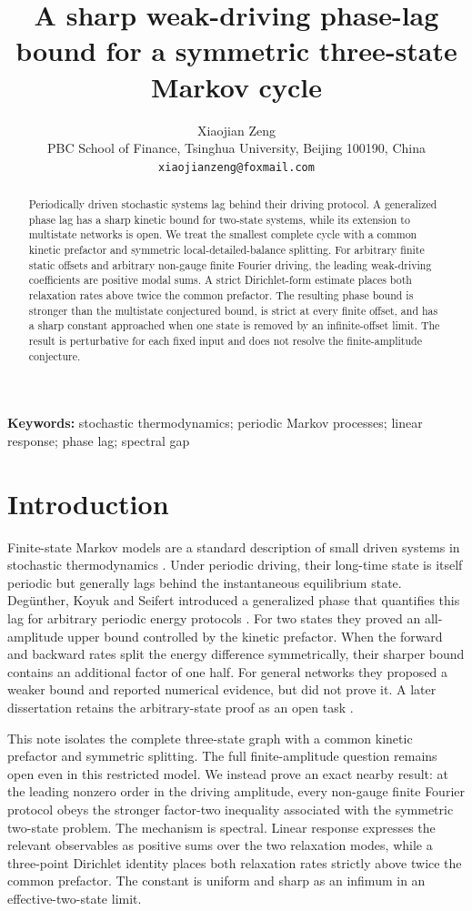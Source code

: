 \documentclass[11pt,a4paper]{article}
\title{A sharp weak-driving phase-lag bound for a symmetric three-state Markov cycle}
\author{Xiaojian Zeng\\
\small PBC School of Finance, Tsinghua University, Beijing 100190, China\\
\small \texttt{xiaojianzeng@foxmail.com}}
\date{}
\begin{document}
\maketitle

\begin{abstract}
Periodically driven stochastic systems lag behind their driving protocol. A generalized
phase lag has a sharp kinetic bound for two-state systems, while its extension to
multistate networks is open. We treat the smallest complete cycle with a common kinetic
prefactor and symmetric local-detailed-balance splitting. For arbitrary finite static
offsets and arbitrary non-gauge finite Fourier driving, the leading weak-driving
coefficients are positive modal sums. A strict Dirichlet-form estimate places both
relaxation rates above twice the common prefactor. The resulting phase bound is stronger
than the multistate conjectured bound, is strict at every finite offset, and has a sharp
constant approached when one state is removed by an infinite-offset limit. The result is
perturbative for each fixed input and does not resolve the finite-amplitude conjecture.
\end{abstract}

\noindent\textbf{Keywords:} stochastic thermodynamics; periodic Markov processes;
linear response; phase lag; spectral gap

\section{Introduction}

Finite-state Markov models are a standard description of small driven systems in
stochastic thermodynamics \cite{Seifert2012}. Under periodic driving, their long-time
state is itself periodic but generally lags behind the instantaneous equilibrium state.
Deg\"unther, Koyuk and Seifert introduced a generalized phase that quantifies this lag
for arbitrary periodic energy protocols \cite{Deguenther2022}. For two states they proved
an all-amplitude upper bound controlled by the kinetic prefactor. When the forward and
backward rates split the energy difference symmetrically, their sharper bound contains
an additional factor of one half. For general networks they proposed a weaker bound and
reported numerical evidence, but did not prove it. A later dissertation retains the
arbitrary-state proof as an open task \cite{Deguenther2024}.

This note isolates the complete three-state graph with a common kinetic prefactor and
symmetric splitting. The full finite-amplitude question remains open even in this
restricted model. We instead prove an exact nearby result: at the leading nonzero order
in the driving amplitude, every non-gauge finite Fourier protocol obeys the stronger
factor-two inequality associated with the symmetric two-state problem. The mechanism is
spectral. Linear response expresses the relevant observables as positive sums over the
two relaxation modes, while a three-point Dirichlet identity places both relaxation
rates strictly above twice the common prefactor. The constant is uniform and sharp as
an infimum in an effective-two-state limit.
\end{document}
